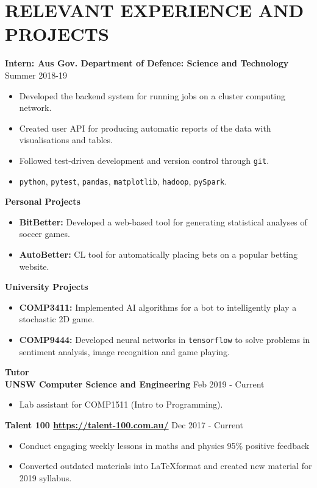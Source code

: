 \documentclass[a4paper,11pt]{article} %
\begin{document}
{\section{RELEVANT EXPERIENCE AND PROJECTS}
{\raggedright
	\textbf{Intern: Aus Gov. Department of Defence: Science and Technology} \hfill Summer 2018-19
\begin{itemize}[wide]
	\item Developed the backend system for running jobs on a cluster computing network. 
	\item Created user API for producing automatic reports of the data with visualisations and tables. 
	\item Followed test-driven development and version control through \texttt{git}. 
	\item \texttt{python}, \texttt{pytest}, \texttt{pandas}, \texttt{matplotlib}, \texttt{hadoop}, \texttt{pySpark}.
\end{itemize}
{\raggedright
\textbf{Personal Projects} 
}
\begin{itemize}[wide]
	\item \textbf{BitBetter:} Developed a web-based tool for generating statistical analyses of soccer games.
	\item \textbf{AutoBetter:} CL tool for automatically placing bets on a popular betting website.
\end{itemize}
{\raggedright
\textbf{University Projects}
}
\begin{itemize}[wide]
	\item \textbf{COMP3411:} Implemented AI algorithms for a bot to intelligently play a stochastic 2D game. 
	\item \textbf{COMP9444:} Developed neural networks in \texttt{tensorflow} to solve problems in sentiment analysis, image recognition and game playing.
\end{itemize}
{\raggedright
\textbf{Tutor} \\
\textbf{UNSW Computer Science and Engineering} \hfill Feb 2019 - Current
\begin{itemize}[wide]
	\item Lab assistant for COMP1511 (Intro to Programming).
\end{itemize}
\textbf{Talent 100 \url{https://talent-100.com.au/}} \hfill Dec 2017 - Current
}
\begin{itemize}[wide]
\item Conduct engaging weekly lessons in maths and physics 95\% positive feedback
\item Converted outdated materials into \LaTeX \thinspace format and created new material for 2019 syllabus.
\end{itemize}
}}
\end{document}
